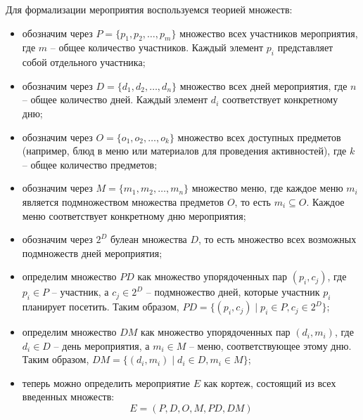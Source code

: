 Для формализации мероприятия воспользуемся теорией множеств:
\begin{itemize}[label=--]
	\item обозначим через $P = \{p_1, p_2, \dots, p_m\}$ множество всех участников мероприятия, где $m$ -- общее количество участников. Каждый элемент $p_i$ представляет собой отдельного участника;
	\item обозначим через $D = \{d_1, d_2, \dots, d_n\}$ множество всех дней мероприятия, где $n$ -- общее количество дней. Каждый элемент $d_i$ соответствует конкретному дню;
	\item обозначим через $O = \{o_1, o_2, \dots, o_k\}$ множество всех доступных предметов (например, блюд в меню или материалов для проведения активностей), где $k$ -- общее количество предметов;
	\item обозначим через $M = \{m_1, m_2, \dots, m_n\}$ множество меню, где каждое меню $m_i$ является подмножеством множества предметов $O$, то есть \newline $m_i \subseteq O$. Каждое меню соответствует конкретному дню мероприятия;
	\item обозначим через $2^D$ булеан множества $D$, то есть множество всех возможных подмножеств дней мероприятия;
	\item определим множество $PD$ как множество упорядоченных пар $(p_i, c_j)$, где $p_i \in P$ -- участник, а $c_j \in 2^D$ -- подмножество дней, которые участник $p_i$ планирует посетить. Таким образом, $PD = \{(p_i, c_j) \mid p_i \in P, c_j \in 2^D\}$;
	\item определим множество $DM$ как множество упорядоченных пар $(d_i, m_i)$, где $d_i \in D$ -- день мероприятия, а $m_i \in M$ -- меню, соответствующее этому дню. Таким образом, $DM = \{(d_i, m_i) \mid d_i \in D, m_i \in M\}$;
	\item теперь можно определить мероприятие \( E \) как кортеж, состоящий из всех введенных множеств:  
	\begin{equation}
		E = (P, D, O, M, PD, DM)
	\end{equation}
\end{itemize}

